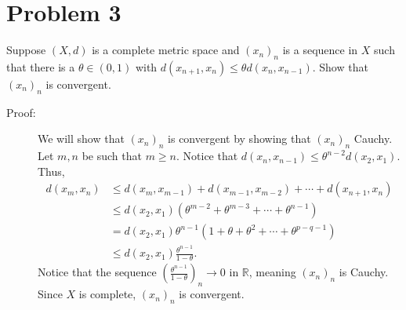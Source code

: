 \documentclass[10pt]{extarticle}
\newcommand{\R}{\mathbb{R}}
\begin{document}
  \section{Problem 3}%
  Suppose $(X,d)$ is a complete metric space and $(x_n)_n$ is a sequence in $X$ such that there is a $\theta \in (0,1)$ with $d(x_{n+1},x_n) \leq \theta d(x_n,x_{n-1})$. Show that $(x_n)_n$ is convergent.
  \begin{description}
    \item[Proof:] We will show that $(x_n)_n$ is convergent by showing that $(x_n)_n$ Cauchy. Let $m,n$ be such that $m\geq n$. Notice that $d(x_n,x_{n-1}) \leq \theta^{n-2}d(x_2,x_1)$. Thus,
      \begin{align*}
        d(x_m,x_n) &\leq d(x_m,x_{m-1}) + d(x_{m-1},x_{m-2}) + \cdots + d(x_{n+1},x_n)\\
                   &\leq d(x_2,x_1)\left(\theta^{m-2} + \theta^{m-3} + \cdots + \theta^{n-1}\right)\\
                   &= d(x_2,x_1) \theta^{n-1}\left(1 + \theta + \theta^2 + \cdots + \theta^{p-q-1}\right)\\
                   &\leq d(x_2,x_1)\frac{\theta^{n-1}}{1-\theta}.
      \end{align*}
      Notice that the sequence $\left(\frac{\theta^{n-1}}{1-\theta}\right)_{n}\rightarrow 0$ in $\R$, meaning $(x_n)_n$ is Cauchy. Since $X$ is complete, $(x_n)_n$ is convergent.
  \end{description}
\end{document}
